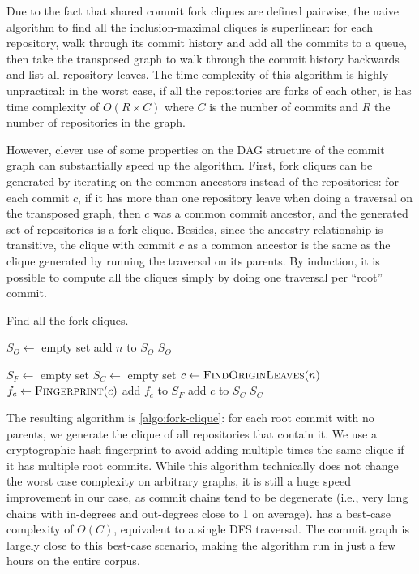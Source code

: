 Due to the fact that shared commit fork cliques are defined pairwise, the naive
algorithm to find all the inclusion-maximal cliques is superlinear: for each
repository, walk through its commit history and add all the commits to a queue,
then take the transposed graph to walk through the commit history backwards and
list all repository leaves. The time complexity of this algorithm is highly
unpractical: in the worst case, if all the repositories are forks of each
other, is has time complexity of $O(R \times C)$ where $C$ is the
number of commits and $R$ the number of repositories in the graph.

However, clever use of some properties on the DAG structure of the commit graph
can substantially speed up the algorithm. First, fork cliques can be generated
by iterating on the common ancestors instead of the repositories: for each
commit $c$, if it has more than one repository leave when doing a traversal on
the transposed graph, then $c$ was a common commit ancestor, and the generated
set of repositories is a fork clique. Besides, since the ancestry relationship
is transitive, the clique with commit $c$ as a common ancestor is the same as
the clique generated by running the traversal on its parents. By induction, it
is possible to compute all the cliques simply by doing one traversal per
``root'' commit.

\begin{algorithm}[t]
  \caption{Find all the fork cliques.}%
  \label{algo:fork-clique}
  \begin{algorithmic}
    \State $S_O \gets$ empty set
            \State add $n$ to $S_O$
        \EndIf
    \EndFor
    \State \Return $S_O$
\EndFunction

    \State $S_F \gets$ empty set
    \State $S_C \gets$ empty set
            \State $c \gets \Call{FindOriginLeaves}{n}$
            \State $f_c \gets \Call{Fingerprint}{c}$
                \State add $f_c$ to $S_F$
                \State add $c$ to $S_C$
            \EndIf
        \EndIf
    \EndFor
    \State \Return $S_C$
\EndFunction
\end{algorithmic}
\end{algorithm}

The resulting algorithm is \cref{algo:fork-clique}: for each root commit
with no parents, we generate the clique of all repositories that contain it. We
use a cryptographic hash fingerprint to avoid adding multiple times the same
clique if it has multiple root commits. While this algorithm technically does
not change the worst case complexity on arbitrary graphs, it is still a huge
speed improvement in our case, as commit chains tend to be degenerate (i.e.,
very long chains with in-degrees and out-degrees close to 1 on
average).  has a best-case complexity of
$\Theta(C)$, equivalent to a single DFS traversal. The commit graph is largely
close to this best-case scenario, making the algorithm run in just a few hours
on the entire corpus.

